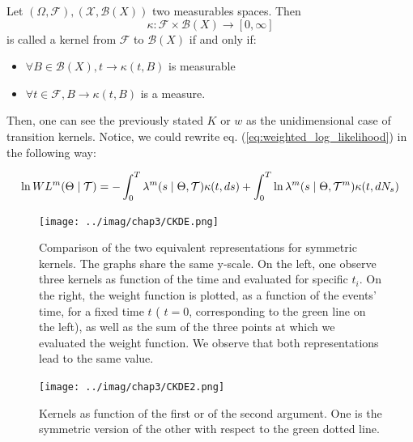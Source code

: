 \documentclass[11pt]{book}
\begin{document}
\begin{definition}
Let $(\Omega, \mathcal F), ( \mathcal X, \mathcal B (X) )$ two measurables spaces. Then $$ \kappa : \mathcal F \times \mathcal B (X) \to [0, \infty] $$ is called a kernel from $\mathcal F$ to $\mathcal B(X)$ if and only if:

\begin{itemize}
\setlength{\itemindent}{3. cm}
\item $\forall B \in \mathcal B(X), t \to \kappa(  t, B)$ is measurable
\item $\forall t \in \mathcal F, B \to \kappa(  t, B)$ is a measure.
\end{itemize}
\end{definition}

Then, one can see the previously stated $K$ or $w$ as the unidimensional case of transition kernels. Notice, we could rewrite eq. (\ref{eq:weighted_log_likelihood}) in the following way:

$$ \ln W L^m( \Theta \mid \mathcal{T} ) = - \int_0^T \lambda^{m} ( s \mid \Theta , \mathcal{T} ) \kappa(t, ds) + \int_0^T \ln \lambda^{m} ( s \mid \Theta , \mathcal{T}^m ) \kappa(t, d N_s)  $$

\begin{figure}
\centering
\texttt{[image: ../imag/chap3/CKDE.png]}
\caption{Comparison of the two equivalent representations for symmetric kernels. The graphs share the same y-scale. On the left, one observe three kernels as function of the time and evaluated for specific $t_i$. On the right, the weight function is plotted, as a function of the events' time, for a fixed time $t$ ( $t= 0$, corresponding to the green line on the left), as well as the sum of the three points at which we evaluated the weight function. We observe that both representations lead to the same value.}
\label{fig:CKDE}
\end{figure}

\begin{figure}
\centering
\texttt{[image: ../imag/chap3/CKDE2.png]}
\caption{Kernels as function of the first or of the second argument. One is the symmetric version of the other with respect to the green dotted line.}
\label{fig:CKDE2}
\end{figure}

\end{document}
